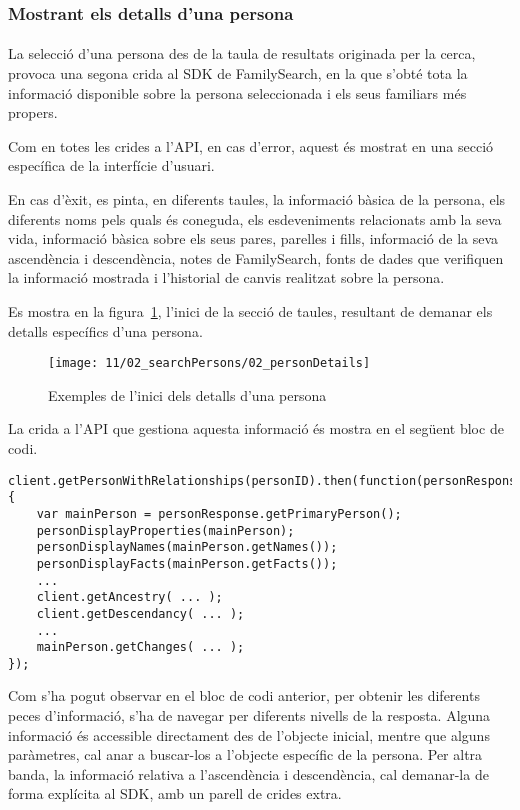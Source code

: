 \subsubsection{Mostrant els detalls d'una persona}

\paragraph{}
La selecció d'una persona des de la taula de resultats originada per la cerca, provoca una segona crida al SDK de FamilySearch, en la que s'obté tota la informació disponible sobre la persona seleccionada i els seus familiars més propers.

Com en totes les crides a l'API, en cas d'error, aquest és mostrat en una secció específica de la interfície d'usuari.

En cas d'èxit, es pinta, en diferents taules, la informació bàsica de la persona, els diferents noms pels quals és coneguda, els esdeveniments relacionats amb la seva vida, informació bàsica sobre els seus pares, parelles i fills, informació de la seva ascendència i descendència, notes de FamilySearch, fonts de dades que verifiquen la informació mostrada i l'historial de canvis realitzat sobre la persona.

Es mostra en la figura~\ref{fig:personSearchDetails}, l'inici de la secció de taules, resultant de demanar els detalls específics d'una persona.

\begin{figure}[h]
    \texttt{[image: 11/02\_searchPersons/02\_personDetails]}
    \centering
    \caption{Exemples de l'inici dels detalls d'una persona}\label{fig:personSearchDetails}
\end{figure}

La crida a l'API que gestiona aquesta informació és mostra en el següent bloc de codi.

\begin{lstlisting}[style=rawOwn,caption={Crida al SDK per obtenir tota la informació d'una persona}]
client.getPersonWithRelationships(personID).then(function(personResponse) {
    var mainPerson = personResponse.getPrimaryPerson();
    personDisplayProperties(mainPerson);
    personDisplayNames(mainPerson.getNames());
    personDisplayFacts(mainPerson.getFacts());
    ...
    client.getAncestry( ... );
    client.getDescendancy( ... );
    ...
    mainPerson.getChanges( ... );
});
\end{lstlisting}

Com s'ha pogut observar en el bloc de codi anterior, per obtenir les diferents peces d'informació, s'ha de navegar per diferents nivells de la resposta. Alguna informació és accessible directament des de l'objecte inicial, mentre que alguns paràmetres, cal anar a buscar-los a l'objecte específic de la persona. Per altra banda, la informació relativa a l'ascendència i descendència, cal demanar-la de forma explícita al SDK, amb un parell de crides extra.

